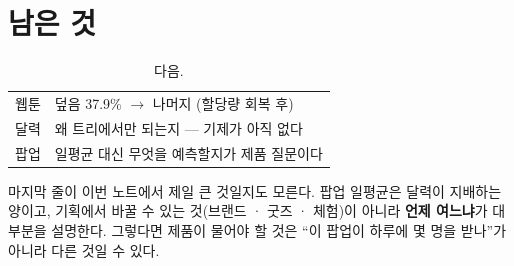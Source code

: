 \documentclass[10pt]{article}
\begin{document}

\section{남은 것}

\begin{table}[t]
\centering\tsize
\caption{다음.}
\begin{tabular}{ll}
\toprule
웹툰 & 덮음 37.9\% $\to$ 나머지 (할당량 회복 후) \\
달력 & 왜 트리에서만 되는지 --- 기제가 아직 없다 \\
팝업 & 일평균 대신 무엇을 예측할지가 제품 질문이다 \\
\bottomrule
\end{tabular}
\end{table}

마지막 줄이 이번 노트에서 제일 큰 것일지도 모른다. 팝업 일평균은 달력이
지배하는 양이고, 기획에서 바꿀 수 있는 것(브랜드 · 굿즈 · 체험)이 아니라
\textbf{언제 여느냐}가 대부분을 설명한다. 그렇다면 제품이 물어야 할 것은
``이 팝업이 하루에 몇 명을 받나''가 아니라 다른 것일 수 있다.
\end{document}
